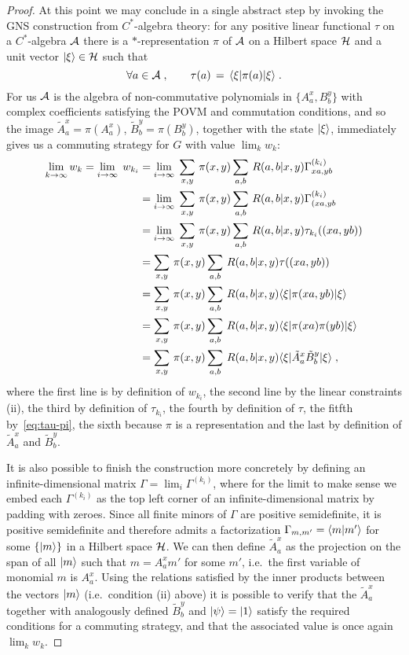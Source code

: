 \begin{proof}
At this point we may conclude in a single abstract step by invoking the GNS construction from $C^*$-algebra theory: for any positive linear functional $\tau$ on a $C^*$-algebra $\mathcal{A}$ there is a $*$-representation $\pi$ of $\mathcal{A}$ on a Hilbert space $\mathcal{H}$ and a unit vector $|\xi\rangle\in \mathcal{H}$ such that 
\begin{equation}\label{eq:tau-pi}
\forall a\in\mathcal{A}\;,\qquad \tau(a) \,=\, \langle\xi| \pi(a)|\xi\rangle\;.
\end{equation}
 For us $\mathcal{A}$ is the algebra of non-commutative polynomials in $\{A^x_a,B^y_b\}$ with complex coefficients satisfying the POVM and commutation conditions, and so the image $\tilde{A}^x_a = \pi(A^x_a)$, $\tilde{B}^y_b = \pi(B^y_b)$, together with the state $|\xi\rangle$, immediately gives us a commuting strategy for $G$ with value $\lim_k w_k$: 
\begin{align*}
\lim_{k\to\infty} w_k = \lim_{i\to\infty}\; w_{k_i} 
&= \lim_{i\to\infty} \;\sum_{x,y}\, \pi(x,y) \sum_{a,b} \, R(a,b|x,y) \Gamma^{(k_i)}_{xa,yb}\\
&= \lim_{i\to\infty} \;\sum_{x,y}\, \pi(x,y) \sum_{a,b} \, R(a,b|x,y) \Gamma^{(k_i)}_{(xa,yb}\\
&= \lim_{i\to\infty} \;\sum_{x,y}\, \pi(x,y) \sum_{a,b} \, R(a,b|x,y) \tau_{k_i}((xa,yb))\\
&= \sum_{x,y}\, \pi(x,y) \sum_{a,b} \, R(a,b|x,y) \tau((xa,yb))\\
&= \sum_{x,y}\, \pi(x,y) \sum_{a,b} \, R(a,b|x,y) \langle\xi| \pi(xa,yb) |\xi\rangle\\
&= \sum_{x,y}\, \pi(x,y) \sum_{a,b} \, R(a,b|x,y) \langle\xi| \pi(xa)\pi(yb) |\xi\rangle\\
&= \sum_{x,y}\, \pi(x,y) \sum_{a,b} \, R(a,b|x,y) \langle\xi| \tilde{A}^x_a \tilde{B}^y_b |\xi\rangle\;,
\end{align*}
where the first line is by definition of $w_{k_i}$, the second line by the linear constraints (ii), the third by definition of $\tau_{k_i}$, the fourth by definition of $\tau$, the fitfth by~\eqref{eq:tau-pi}, the sixth because $\pi$ is a representation and the last by definition of $\tilde{A}^x_a $ and $\tilde{B}^y_b$. 

It is also possible to finish the construction more concretely by defining an infinite-dimensional matrix $\Gamma = \lim_i \Gamma^{(k_i)}$, where for the limit to make sense we embed each $\Gamma^{(k_i)}$ as the top left corner of an infinite-dimensional matrix by padding with zeroes. Since all finite minors of $\Gamma$ are positive semidefinite, it is positive semidefinite and therefore admits a factorization $\Gamma_{m,m'} = \langle m|m'\rangle$ for some $\{|m\rangle\}$ in a Hilbert space $\mathcal{H}$. We can then define $\tilde{A}^x_a$ as the projection on the span of all $|m\rangle$ such that $m = A^x_a m' $ for some $m'$, i.e.\ the first variable of monomial $m$ is $A^x_a$. Using the relations satisfied by the inner products between the vectors $|m\rangle$ (i.e.\ condition (ii) above) it is possible to verify that the $\tilde{A}^x_a$ together with analogously defined $\tilde{B}^y_b$ and $|\psi\rangle = |1\rangle$ satisfy the required conditions for a commuting strategy, and that the associated value is once again $\lim_k w_k$.
\end{proof}

